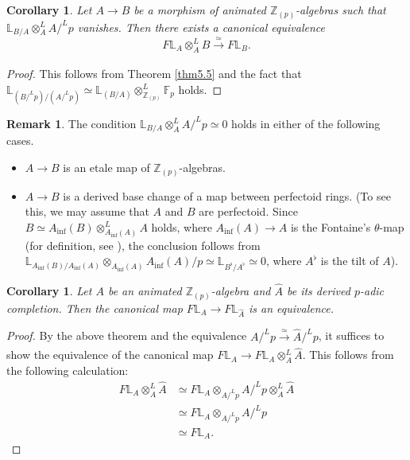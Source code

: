 \documentclass[11pt, a4paper]{amsart}
\theoremstyle{plain}
\newtheorem{coro}[theorem]{Corollary}
\theoremstyle{definition}
\newtheorem{remark}[theorem]{Remark}
\begin{document}
\begin{coro}\label{cor5.6}
    Let $A\to B$ be a morphism of animated $\mathbb Z_{(p)}$-algebras such that $\mathbb L_{B/A}\otimes_A^LA/^Lp$ vanishes. Then there exists a canonical equivalence \[F\mathbb L_A\otimes^L_AB\xrightarrow[]{\simeq }F\mathbb L_B.\]
\end{coro}
\begin{proof}
    This follows from Theorem \ref{thm5.5} and the fact that $\mathbb L_{(B/^Lp)/(A/^Lp)}\simeq \mathbb L_{(B/A)}\otimes_{\mathbb Z_{(p)}}^L\mathbb F_p$ holds.
\end{proof}
\begin{remark}\label{rem5.7}
    The condition $\mathbb L_{B/A}\otimes_A^LA/^Lp\simeq 0$ holds in either of the following cases.\begin{itemize}
        \item $A\to B$ is an etale map of $\mathbb Z_{(p)}$-algebras.
        \item $A\to B$ is a derived base change of a map between perfectoid rings. (To see this, we may assume that $A$ and $B$ are perfectoid. Since $B\simeq A_{\mathrm{inf}}(B)\otimes^L_{A_{\mathrm{inf}}(A)}A$ holds, where $A_{\mathrm{inf}}(A)\to A$ is the Fontaine's $\theta$-map (for definition, see \cite[Section 3.1]{BMS18}), the conclusion follows from $\mathbb L_{A_{\mathrm{inf}}(B)/A_{\mathrm{inf}}(A)}\otimes_{A_{\mathrm{inf}}(A)}A_{\mathrm{inf}}(A)/p\simeq \mathbb L_{B^{\flat}/A^{\flat}}\simeq 0$, where $A^{\flat}$ is the tilt of $A$).
    \end{itemize}
\end{remark}
\begin{coro}\label{cor5.8}
    Let $A$ be an animated $\mathbb Z_{(p)}$-algebra and $\widehat A$ be its derived $p$-adic completion. Then the canonical map $F\mathbb L_A\to F\mathbb L_{\widehat A}$ is an equivalence.
\end{coro}
\begin{proof}
    By the above theorem and the equivalence $A/^Lp\xrightarrow[]{\simeq }\widehat A/^Lp$, it suffices to show the equivalence of the canonical map $F\mathbb L_A\to F\mathbb L_A\otimes_A^L\widehat A$. This follows from the following calculation:\begin{align*}
        F\mathbb L_A\otimes_A^L\widehat A&\simeq F\mathbb L_A\otimes_{A/^Lp}A/^Lp\otimes_A^L\widehat A\\&\simeq F\mathbb L_A\otimes_{A/^Lp}A/^Lp\\&\simeq F\mathbb L_A.
    \end{align*}
\end{proof}
\end{document}
